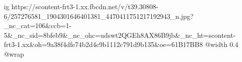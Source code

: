  
 
 
 
 

\ifcmt
  ig https://scontent-frt3-1.xx.fbcdn.net/v/t39.30808-6/257276581_1904301646401381_4470411751217192943_n.jpg?_nc_cat=106&ccb=1-5&_nc_sid=8bfeb9&_nc_ohc=udswt2QGEh8AX86B9jb&_nc_ht=scontent-frt3-1.xx&oh=9a38f4dfe74b2d4c9b1112c791d9b135&oe=61B17BB8
  @width 0.4
  @wrap 
\fi
